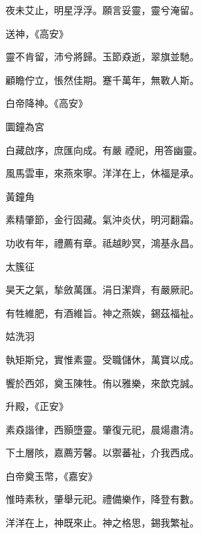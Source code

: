 \begin{pinyinscope}
 夜未艾止，明星浮浮。願言妥靈，靈兮淹留。



 送神，《高安》



 靈不肯留，沛兮將歸。玉節猋逝，翠旗並馳。



 顧瞻佇立，悵然佳期。蹇千萬年，無斁人斯。



 白帝降神。《高安》



 圜鐘為宮



 白藏啟序，庶匯向成。有嚴
 禋祀，用答幽靈。



 風馬雲車，來燕來寧。洋洋在上，休福是承。



 黃鐘角



 素精肇節，金行固藏。氣沖炎伏，明河翻霜。



 功收有年，禮薦有章。祗越眇冥，鴻基永昌。



 太簇征



 昊天之氣，揫斂萬匯。涓日潔齊，有嚴厥祀。



 有牲維肥，有酒維旨。神之燕娭，錫茲福祉。



 姑洗羽



 執矩斯兌，實惟素靈。受職儲休，萬寶以成。



 饗於西郊，奠玉陳牲。侑以雅樂，來歆克誠。



 升殿，《正安》



 素猋諧律，西顥墮靈。肇復元祀，晨煬肅清。



 下土層陔，嘉薦芳馨。以禦蕃祉，介我西成。



 白帝奠玉幣，《嘉安》



 惟時素秋，肇舉元祀。禮備樂作，降登有數。



 洋洋在上，神既來止。神之格思，錫我繁祉。




\end{pinyinscope}
